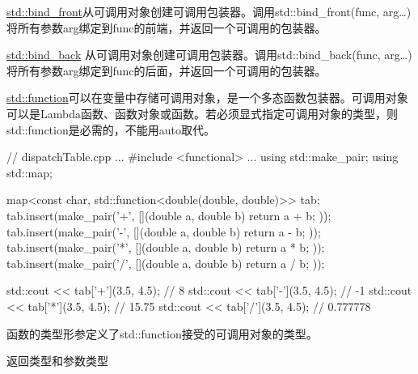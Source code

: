 
\href{https://en.cppreference.com/w/cpp/utility/functional/bind_front}{std::bind\_front}从可调用对象创建可调用包装器。调用std::bind\_front(func, arg…)将所有参数arg绑定到func的前端，并返回一个可调用的包装器。



\href{https://en.cppreference.com/w/cpp/utility/functional/bind_front}{std::bind\_back} 从可调用对象创建可调用包装器。调用std::bind\_back(func, arg…)将所有参数arg绑定到func的后面，并返回一个可调用的包装器。


\href{http://en.cppreference.com/w/cpp/utility/functional/function}{std::function}可以在变量中存储可调用对象，是一个多态函数包装器。可调用对象可以是Lambda函数、函数对象或函数。若必须显式指定可调用对象的类型，则std::function是必需的，不能用auto取代。


\begin{cpp}
// dispatchTable.cpp
...
#include <functional>
...
using std::make_pair;
using std::map;

map<const char, std::function<double(double, double)>> tab;
tab.insert(make_pair('+', [](double a, double b){ return a + b; }));
tab.insert(make_pair('-', [](double a, double b){ return a - b; }));
tab.insert(make_pair('*', [](double a, double b){ return a * b; }));
tab.insert(make_pair('/', [](double a, double b){ return a / b; }));

std::cout << tab['+'](3.5, 4.5); // 8
std::cout << tab['-'](3.5, 4.5); // -1
std::cout << tab['*'](3.5, 4.5); // 15.75
std::cout << tab['/'](3.5, 4.5); // 0.777778
\end{cpp}

函数的类型形参定义了std::function接受的可调用对象的类型。

\begin{center}
返回类型和参数类型
\end{center}

